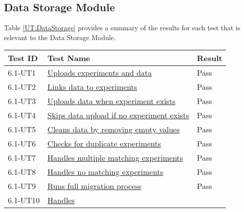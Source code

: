 \documentclass[12pt, titlepage]{article}
\begin{document}
\subsection{Data Storage Module}
Table \ref{UT:DataStorage} provides a summary of the results for each test that
is relevant to the Data Storage Module.
\begin{table}[H]
  \centering
  \begin{tabular}{|l|l|l|}
    \hline
    \textbf{Test ID} & \textbf{Test Name} & \textbf{Result}\\
    \hline
    6.1-UT1 &
    \href{https://github.com/SumanyaG/Alkalytics/blob/main/src/backend/test/migrationServiceTest.py}{Uploads
    experiments and data} & Pass \\
    \hline
    6.1-UT2 &
    \href{https://github.com/SumanyaG/Alkalytics/blob/main/src/backend/test/migrationServiceTest.py}{Links
    data to experiments} & Pass \\
    \hline
    6.1-UT3 &
    \href{https://github.com/SumanyaG/Alkalytics/blob/main/src/backend/test/migrationServiceTest.py}{Uploads
    data when experiment exists} & Pass \\
    \hline
    6.1-UT4 &
    \href{https://github.com/SumanyaG/Alkalytics/blob/main/src/backend/test/migrationServiceTest.py}{Skips
    data upload if no experiment exists} & Pass \\
    \hline
    6.1-UT5 &
    \href{https://github.com/SumanyaG/Alkalytics/blob/main/src/backend/test/migrationServiceTest.py}{Cleans
    data by removing empty values} & Pass \\
    \hline
    6.1-UT6 &
    \href{https://github.com/SumanyaG/Alkalytics/blob/main/src/backend/test/migrationServiceTest.py}{Checks
    for duplicate experiments} & Pass \\
    \hline
    6.1-UT7 &
    \href{https://github.com/SumanyaG/Alkalytics/blob/main/src/backend/test/migrationServiceTest.py}{Handles
    multiple matching experiments} & Pass \\
    \hline
    6.1-UT8 &
    \href{https://github.com/SumanyaG/Alkalytics/blob/main/src/backend/test/migrationServiceTest.py}{Handles
    no matching experiments} & Pass \\
    \hline
    6.1-UT9 &
    \href{https://github.com/SumanyaG/Alkalytics/blob/main/src/backend/test/migrationServiceTest.py}{Runs
    full migration process} & Pass \\
    \hline
    6.1-UT10 &
    \href{https://github.com/SumanyaG/Alkalytics/blob/main/src/backend/test/migrationServiceTest.py}{Handles
}
\end{tabular}
\end{table}
\end{document}
